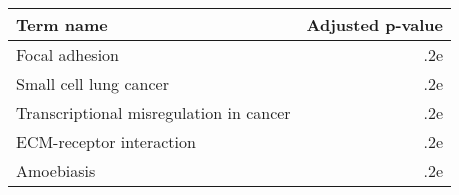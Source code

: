 \begin{tabular}{lr}
\toprule
                              Term name &  Adjusted p-value \\
\midrule
                         Focal adhesion &               .2e \\
                 Small cell lung cancer &               .2e \\
Transcriptional misregulation in cancer &               .2e \\
               ECM-receptor interaction &               .2e \\
                             Amoebiasis &               .2e \\
\bottomrule
\end{tabular}
